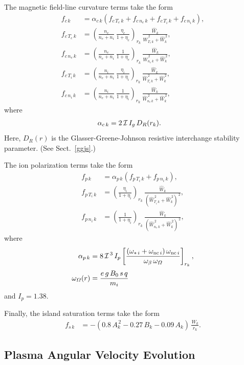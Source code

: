 \documentclass[12pt,prb,aps]{revtex4-1}
\begin{document}
The magnetic field-line curvature terms take the form
\begin{align}
f_{c\,k} &= \alpha_{c\,k}\left(f_{c\,T_e\,k} + f_{c\,n_e\,k} + f_{c\,T_i\,k} + f_{c\,n_i\,k}\right),\\[0.5ex]
f_{c\,T_e\,k}&=\left(\frac{n_e}{n_e+n_i}\,\frac{\eta_e}{1+\eta_e}\right)_{r_k}\,\frac{\hat{W}_k}{\hat{W}_{T_e\,k}^{\,2}+\hat{W}_k^{\,2}},\\[0.5ex]
f_{c\,n_e\,k}&=\left(\frac{n_e}{n_e+n_i}\,\frac{1}{1+\eta_e}\right)_{r_k}\,\frac{\hat{W}_k}{\hat{W}_{n_e\,k}^{\,2}+\hat{W}_k^{\,2}},\\[0.5ex]
f_{c\,T_i\,k}&=\left(\frac{n_i}{n_e+n_i}\,\frac{\eta_i}{1+\eta_i}\right)_{r_k}\,\frac{\hat{W}_k}{\hat{W}_{T_i\,k}^{\,2}+\hat{W}_k^{\,2}},\\[0.5ex]
f_{c\,n_i\,k}&=\left(\frac{n_i}{n_e+n_i}\,\frac{1}{1+\eta_i}\right)_{r_k}\,\frac{\hat{W}_k}{\hat{W}_{n_e\,k}^{\,2}+\hat{W}_k^{\,2}},
\end{align}
where
\begin{align}
\alpha_{c\,k} &= 2\,{\cal I}\,I_g\,D_R(r_k).
\end{align}
Here, $D_R(r)$ is the Glasser-Greene-Johnson resistive interchange stability parameter. (See Sect.~\ref{ggjs}.)

The ion polarization terms take the form
\begin{align}
f_{p\,k} &= \alpha_{p\,k}\left(f_{p\,T_i\,k} + f_{p\,n_i\,k}\right),\\[0.5ex]
f_{p\,T_i\,k}&=\left(\frac{\eta_i}{1+\eta_i}\right)_{r_k}\,\frac{\hat{W}_k}{(\hat{W}_{T_i\,k}^{\,2}+\hat{W}_k^{\,2})^{\,2}},\\[0.5ex]
f_{p\,n_i\,k}&=\left(\frac{1}{1+\eta_i}\right)_{r_k}\,\frac{\hat{W}_k}{(\hat{W}_{n_e\,k}^{\,2}+\hat{W}_k^{\,2})^{\,2}},
\end{align}
where
\begin{align}
\alpha_{p\,k} &= 8\,{\cal I}^{\,3}\, I_p\left[\frac{(\omega_{\ast\,i}+\omega_{{\rm nc}\,i})\,\omega_{{\rm nc}\,i}}{\omega_\beta\,\omega_{\mit\Omega}}\right]_{r_k},\\[0.5ex]
\omega_{\mit\Omega}(r)&= \frac{e\,g\,B_0\,s\,q}{m_i}
\end{align}
and  $I_p=1.38$. 


Finally, the island saturation terms take the form\,\cite{porc}
\begin{align}
f_{s\,k} &=-(0.8\,A_k^{\,2} - 0.27\,B_k-0.09\,A_k)\,
\frac{W_k}{r_k}.
\end{align}


\subsection{Plasma Angular Velocity Evolution}\label{a4}
\end{document}
